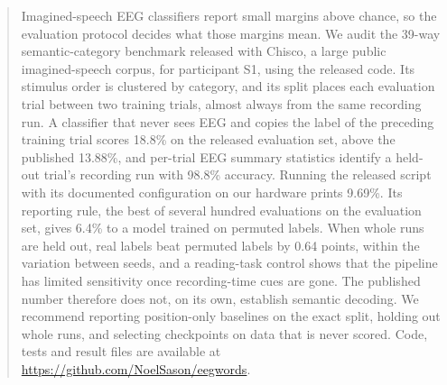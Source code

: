 \begin{abstract}
Imagined-speech EEG classifiers report small margins above chance, so the evaluation protocol decides
what those margins mean. We audit the 39-way semantic-category benchmark released with Chisco, a
large public imagined-speech corpus, for participant S1, using the released code. Its stimulus
order is clustered by category, and its split places each evaluation trial between two training
trials, almost always from the same recording run. A classifier that never sees EEG and copies the label of the preceding
training trial scores 18.8\% on the released evaluation set, above the published 13.88\%, and
per-trial EEG summary statistics identify a held-out trial's recording run with 98.8\% accuracy.
Running the released script with its documented configuration on our hardware prints 9.69\%. Its
reporting rule, the best of several hundred evaluations on the evaluation set, gives 6.4\% to a model
trained on permuted labels. When whole runs are held out, real labels beat permuted labels by 0.64
points, within the variation between seeds, and a reading-task control shows that the pipeline has
limited sensitivity once recording-time cues are gone. The published number therefore does not, on its
own, establish semantic decoding. We recommend reporting position-only baselines on the exact split,
holding out whole runs, and selecting checkpoints on data that is never scored. Code, tests and
result files are available at \url{https://github.com/NoelSason/eegwords}.
\end{abstract}
